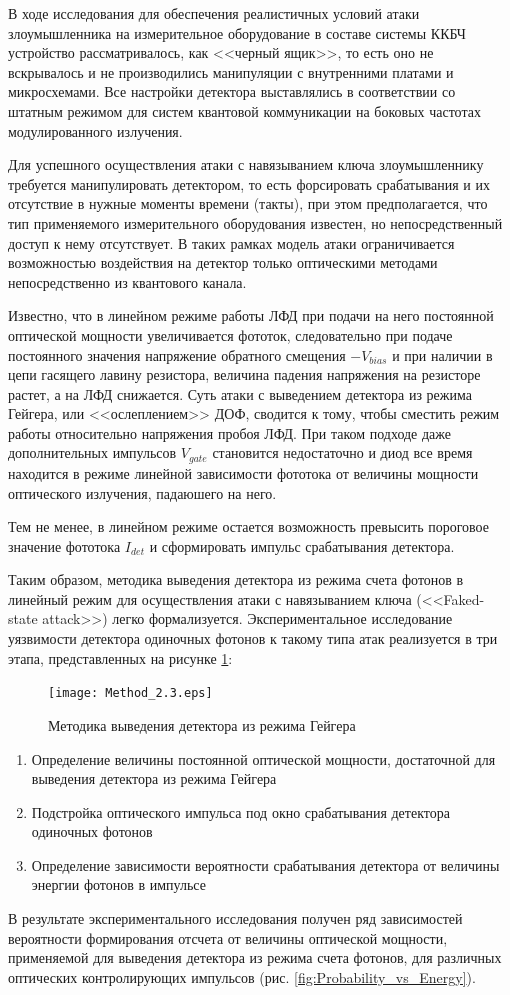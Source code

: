 В ходе исследования для обеспечения реалистичных условий атаки злоумышленника на измерительное оборудование в составе системы ККБЧ устройство рассматривалось, как <<черный ящик>>, то есть оно не вскрывалось и не производились манипуляции с внутренними платами и микросхемами. Все настройки детектора выставлялись в соответствии со штатным режимом для систем квантовой коммуникации на боковых частотах модулированного излучения. 

Для успешного осуществления атаки с навязыванием ключа злоумышленнику требуется манипулировать детектором, то есть форсировать срабатывания и их отсутствие в нужные моменты времени (такты), при этом предполагается, что тип применяемого измерительного оборудования известен, но непосредственный доступ к нему отсутствует. В таких рамках модель атаки ограничивается возможностью воздействия на детектор только оптическими методами непосредственно из квантового канала. 


Известно, что в линейном режиме работы ЛФД при подачи на него постоянной оптической мощности увеличивается фототок, следовательно при подаче постоянного значения напряжение обратного смещения $-V_{bias}$ и при наличии в цепи гасящего лавину резистора, величина падения напряжения на резисторе растет, а на ЛФД снижается. Суть атаки с выведением детектора из режима Гейгера, или <<ослеплением>> ДОФ, сводится к тому, чтобы сместить режим работы относительно напряжения пробоя ЛФД. При таком подходе даже дополнительных импульсов $V_{gate}$ становится недостаточно и диод все время находится в режиме линейной зависимости фототока от величины мощности оптического излучения, падаюшего на него.  

Тем не менее, в линейном режиме остается возможность превысить пороговое значение фототока $I_{det}$ и сформировать импульс срабатывания детектора.

Таким образом, методика выведения детектора из режима счета фотонов в линейный режим для осуществления атаки с навязыванием ключа (<<Faked-state attack>>) легко формализуется. Экспериментальное исследование уязвимости детектора одиночных фотонов к такому типа атак реализуется в три этапа, представленных на рисунке \ref{fig:Method_2.3}:
%
 \begin{figure}[ht] 
  \centering
  \texttt{[image: Method\_2.3.eps]}
  \caption{Методика выведения детектора из режима Гейгера}
  \label{fig:Method_2.3}
\end{figure}
%
 \begin{enumerate}
	\item Определение величины постоянной оптической мощности, достаточной для выведения детектора из режима Гейгера
	\item Подстройка оптического импульса под окно срабатывания детектора одиночных фотонов
	\item Определение зависимости вероятности срабатывания детектора от величины энергии фотонов в импульсе
\end{enumerate}
%
В результате экспериментального исследования получен ряд зависимостей вероятности формирования отсчета от величины оптической мощности, применяемой для выведения детектора из режима счета фотонов, для различных оптических контролирующих импульсов (рис. \ref{fig:Probability_vs_Energy}). 

